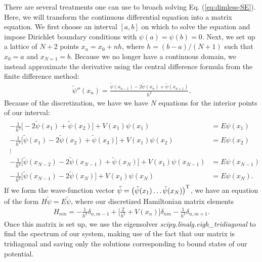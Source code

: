 There are several treatments one can use to broach solving Eq. (\ref{eq:dimless-SE}).
Here, we will transform the continuous differential equation into a matrix equation.
We first choose an interval $[a,b]$ on which to solve the equation and impose Dirichlet boundary conditions with $\psi(a) = \psi(b) = 0$.
Next, we set up a lattice of $N + 2$ points $x_{n} = x_0 + n h$, where $h = (b - a)/(N+1)$ such that $x_0 = a$ and $x_{N=1} = b$.
Because we no longer have a continuous domain, we instead approximate the derivative using the central difference formula from the finite difference method:
\begin{align}
    \tilde{\psi}''(x_{n}) = \frac{\tilde{\psi}(x_{n-1}) - 2 \tilde{\psi}(x_{n}) + \tilde{\psi}(x_{n+1})}{h^2}
.\end{align}
Because of the discretization, we have we have $N$ equations for the interior points of our interval:
\begin{align}
\begin{aligned}
    -\frac{1}{h^2} \Big[ -2 \tilde{\psi}(x_1) + \tilde{\psi}(x_2) \Big] + V(x_{1}) \psi(x_1) &= E \psi(x_1) \\
    -\frac{1}{h^2} \Big[ \tilde{\psi}(x_1) - 2 \tilde{\psi}(x_2) + \tilde{\psi}(x_3) \Big] + V(x_{1}) \psi(x_2) &= E \psi(x_2) \\
    \vdots \\
    -\frac{1}{h^2} \Big[ \tilde{\psi}(x_{N-2}) - 2 \tilde{\psi}(x_{N-1}) + \tilde{\psi}(x_{N}) \Big] + V(x_{1}) \psi(x_{N-1}) &= E \psi(x_{N-1}) \\
    -\frac{1}{h^2} \Big[ \tilde{\psi}(x_{N-1}) - 2 \tilde{\psi}(x_{N}) \Big] + V(x_{1}) \psi(x_{N}) &= E \psi(x_{N})
.\end{aligned}
\end{align}
If we form the wave-function vector $\tilde{\psi} = \begin{pmatrix} \tilde{\psi}(x_{1}) \hdots \tilde{\psi}(x_{N}) \end{pmatrix}^{\rm T}$, we have an equation of the form $H \tilde{\psi} = E \tilde{\psi}$, where our discretized Hamiltonian matrix elements
\begin{align}
    H_{nm} = -\frac{1}{h^2} \delta_{n,m-1} + \Big[ \frac{2}{h^2} + V(x_{n}) \Big] \delta_{nm} - \frac{1}{h^2} \delta_{n,m+1}
.\end{align}
Once this matrix is set up, we use the eigensolver \textit{scipy.linalg.eigh\_tridiagonal} to find the spectrum of our system, making use of the fact that our matrix is tridiagonal and saving only the solutions corresponding to bound states of our potential.


